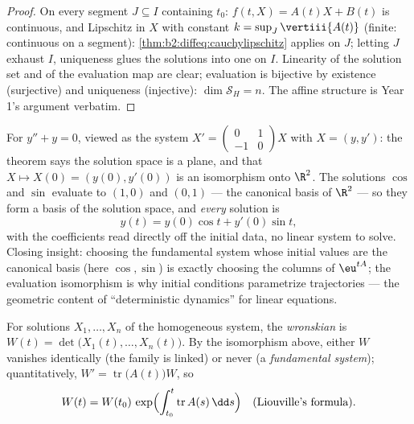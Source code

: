 \begin{proof}
On every segment $J \subseteq I$ containing $t_0$: $f(t, X) =
A(t)X + B(t)$ is continuous, and Lipschitz in $X$ with constant $k
= \sup_J \vertiii{A(t)}$ (finite: continuous on a segment):
\cref{thm:b2:diffeq:cauchylipschitz} applies on $J$; letting $J$
exhaust $I$, uniqueness glues the solutions into one on $I$.
Linearity of the solution set and of the evaluation map are clear;
evaluation is bijective by existence (surjective) and uniqueness
(injective): $\dim \mathcal{S}_H = n$. The affine structure is Year
1's argument verbatim.
\end{proof}

\begin{example}\label{ex:b2:diffeq:evaliso}
For $y'' + y = 0$, viewed as the system $X' =
\begin{pmatrix} 0 & 1\\ -1 & 0\end{pmatrix}X$ with $X = (y,
y')$: the theorem says the solution space is a plane, and that
$X \mapsto X(0) = (y(0), y'(0))$ is an isomorphism onto
$\R^2$. The solutions $\cos$ and $\sin$ evaluate to $(1, 0)$
and $(0, 1)$ --- the canonical basis of $\R^2$ --- so they form
a basis of the solution space, and \emph{every} solution is
\[
y(t) = y(0)\cos t + y'(0)\sin t ,
\]
with the coefficients read directly off the initial data, no
linear system to solve. Closing insight: choosing the
fundamental system whose initial values are the canonical
basis (here $\cos, \sin$) is exactly choosing the columns of
$\eu^{tA}$; the evaluation isomorphism is why initial
conditions parametrize trajectories --- the geometric content
of ``deterministic dynamics'' for linear equations.
\end{example}

\begin{definition}[Wronskian]\label{def:b2:diffeq:wronskian}
For solutions $X_1, \dots, X_n$ of the homogeneous system, the
\emph{wronskian} is $W(t) = \det\bigl(X_1(t),
\dots, X_n(t)\bigr)$. By the isomorphism above, either $W$ vanishes
identically (the family is linked) or never (a \emph{fundamental
system}); quantitatively, $W' = \operatorname{tr}\bigl(A(t)\bigr)
W$, so
\[
W(t) = W(t_0)\,\exp\Bigl(\int_{t_0}^{t}
\operatorname{tr} A(s)\,\dd s\Bigr)
\quad \text{(Liouville's formula)}.
\]
\end{definition}

